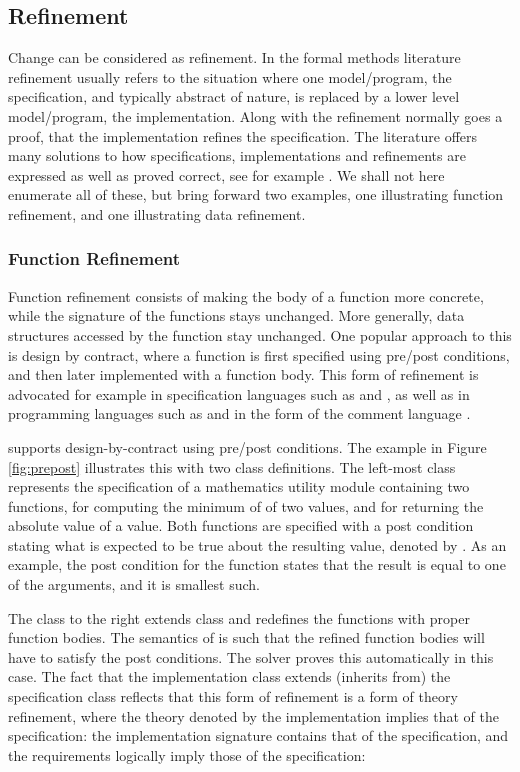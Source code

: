 \subsection{Refinement}

Change can be considered as refinement. In the formal methods literature
refinement usually refers to the situation where one model/program, the 
specification, and typically abstract of nature, is replaced by a lower 
level model/program, the implementation. Along with the refinement normally
goes a proof, that the implementation refines the specification.
The literature offers many solutions to how specifications, implementations and 
refinements are expressed as well as proved correct, see for example 
\cite{vdm,raise}. We shall not here enumerate all of these, but bring forward two 
examples, one illustrating function refinement, and one illustrating data 
refinement.

\subsubsection{Function Refinement}

Function refinement consists of making the body of a function more concrete,
while the signature of the functions stays unchanged. More generally, data 
structures accessed by the function stay unchanged. One popular approach to this
is design by contract, where a function is first specified using pre/post 
conditions, and then later implemented with a function body. This form of 
refinement is advocated for example in specification languages such as 
\vdm{} \cite{vdm} and \raiselang{} \cite{raise}, as well as in programming
languages such as \eiffel{} \cite{eiffel} and \java{} in the form of the \jml{}
comment language \cite{jml}. 

\Klang{} supports design-by-contract using pre/post conditions. The example in
Figure \ref{fig:prepost} illustrates this with two class definitions. The left-most
class  represents the specification of a mathematics utility 
module containing two functions,  for computing the minimum of of
two values, and  for returning the absolute value of a value. Both 
functions are specified with a post condition stating what is expected to be true
about the resulting value, denoted by . As an example, the post
condition for the  function states that the result is equal to one of
the arguments, and it is smallest such.

The class 
to the right extends class  and redefines the functions with
proper function bodies. The semantics of \Klang{} is such that the refined function 
bodies will have to satisfy the post conditions. The \Klang{} solver proves this
automatically in this case. The fact that the implementation class extends 
(inherits from) the specification class reflects that this form of refinement is a 
form of theory refinement, where the theory denoted by the implementation implies 
that of the specification: the implementation signature contains that of the 
specification, and the requirements logically imply those of the specification:

